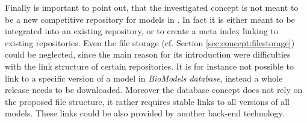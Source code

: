 Finally is important to point out, that the investigated concept is not meant to be a new competitive repository for models in \sysbio. In fact it is either meant to be integrated into an existing repository, or to create a meta index linking to existing repositories. Even the file storage (cf. Section \ref{sec:concept:filestorage}) could be neglected, since the main reason for its introduction were difficulties with the link structure of certain repositories. It is for instance not possible to link to a specific version of a model in \emph{BioModels database}, instead a whole release needs to be downloaded. Moreover the database concept does not rely on the proposed file structure, it rather requires stable links to all versions of all models. These links could be also provided by another back-end technology.

\begin{comment}
\todo{incorporate former outlook section}
\begin{itemize}
	\item outlook
	\subitem Improving search index with metrics on how much impact a change had to the search criteria
	\subsubitem "Incremental Query Evaluation. When a user has a standing query against a time-varying data source, a change-detection tool can provide the query engine the delta data on which the query will be re-evaluated. Thus, the user doesn’t receive old results and the query engine avoids repeated work. Since the delta data is usually much smaller than the original data, query evaluation will also be much faster." \citep{Wang2003}
	\subitem detecting similar changes on different models
\end{itemize}
\end{comment}

\begin{comment}
\begin{itemize}
	\item Benchmarks/stats on database
		\subitem additional overhead (nodes/relations increase)
	\item How to improve database/reduce overhead
	\item 2 branches of \comodi unused
		\subitem because of automatic generation
		\subitem reason and intention not able to be automatically determined
		\subitem possible extension?
\end{itemize}
\end{comment}